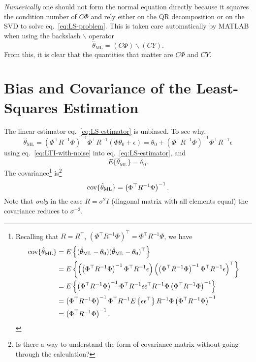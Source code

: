 \emph{Numerically} one should not form the normal equation directly because it squares the condition number of $C\Phi$ and rely either on the QR decomposition or on the SVD to solve eq.~\eqref{eq:LS-problem}.
This is taken care automatically by MATLAB when using the backslash $\backslash$ operator
\begin{equation}
  \label{eq:LS-numerical-solution}
  \hat{\theta}_\text{ML} = (C\Phi) \backslash (CY).
\end{equation}
From this, it is clear that the quantities that matter are $C\Phi$ and $CY$.

\section{Bias and Covariance of the Least-Squares Estimation}
\label{sec:bias-variance-LS-estimation}

The linear estimator eq.~\eqref{eq:LS-estimator} is unbiased.
To see why,
\begin{equation*}
  \hat{\theta}_\text{ML} = \left(\Phi^\top R^{-1} \Phi\right)^{-1} \Phi^\top R^{-1}(\Phi\theta_0 + \epsilon) = \theta_0 + \left(\Phi^\top R^{-1} \Phi\right)^{-1} \Phi^\top R^{-1}\epsilon
\end{equation*}
using eq.~\eqref{eq:LTI-with-noise} into eq.~\eqref{eq:LS-estimator}, and
\begin{equation*}
  E\{\hat{\theta}_\text{ML}\} = \theta_0.
\end{equation*}
The covariance\footnote{Recalling that $R=R^\top$, $\left(\Phi^\top R^{-1} \Phi\right)^\top = \Phi^\top R^{-1} \Phi$, we have
  \begin{align*} \textrm{cov}\{\hat{\theta}_\text{ML}\} &= E\left\{(\hat{\theta}_\text{ML}-\theta_0) (\hat{\theta}_\text{ML}-\theta_0)^\top\right\} \\
                                                &= E\left\{\left(\left(\Phi^\top R^{-1} \Phi\right)^{-1} \Phi^\top R^{-1}\epsilon\right)\left(\left(\Phi^\top R^{-1} \Phi\right)^{-1} \Phi^\top R^{-1}\epsilon\right)^\top\right\} \\
                                                &= E\left\{\left(\Phi^\top R^{-1} \Phi\right)^{-1} \Phi^\top R^{-1}\epsilon \epsilon^\top R^{-1}\Phi \left(\Phi^\top R^{-1} \Phi\right)^{-1}\right\} \\
                                                &= \left(\Phi^\top R^{-1} \Phi\right)^{-1} \Phi^\top R^{-1}E\left\{\epsilon \epsilon^\top\right\} R^{-1} \Phi \left(\Phi^\top R^{-1} \Phi\right)^{-1} \\
                                                &= \left(\Phi^\top R^{-1}\Phi\right)^{-1}.
  \end{align*}
} is\footnote{Is there a way to understand the form of covariance matrix without going through the calculation?}
\begin{equation*}
  \textrm{cov}\{\hat{\theta}_\text{ML}\} = \left(\Phi^\top R^{-1}\Phi\right)^{-1}.
\end{equation*}
Note that \emph{only} in the case $R=\sigma^2I$ (diagonal matrix with all elements equal) the covariance reduces to $\sigma^{-2}$.

